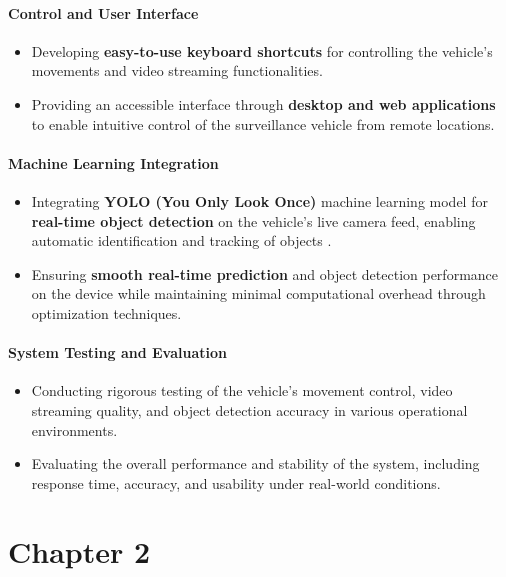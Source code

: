 \documentclass[12pt,a4paper]{report}
\begin{document}
\subsubsection*{Control and User Interface}  
\begin{itemize}  
    \item Developing \textbf{easy-to-use keyboard shortcuts} for controlling the vehicle’s movements and video streaming functionalities.  
    \item Providing an accessible interface through \textbf{desktop and web applications} to enable intuitive control of the surveillance vehicle from remote locations.  
\end{itemize}  

\subsubsection*{Machine Learning Integration}  
\begin{itemize}  
    \item Integrating \textbf{YOLO (You Only Look Once)} machine learning model for \textbf{real-time object detection} on the vehicle's live camera feed, enabling automatic identification and tracking of objects \cite{yolov10}.  
    \item Ensuring \textbf{smooth real-time prediction} and object detection performance on the device while maintaining minimal computational overhead through optimization techniques.  
\end{itemize}  

\subsubsection*{System Testing and Evaluation}  
\begin{itemize}  
    \item Conducting rigorous testing of the vehicle’s movement control, video streaming quality, and object detection accuracy in various operational environments.  
    \item Evaluating the overall performance and stability of the system, including response time, accuracy, and usability under real-world conditions.  
\end{itemize}  





	{\vfill \chapter*{\centering \vfill Chapter 2 \vfill}\vfill}
	\thispagestyle{empty}
	\newpage
\label{Literature Review}
\end{document}

